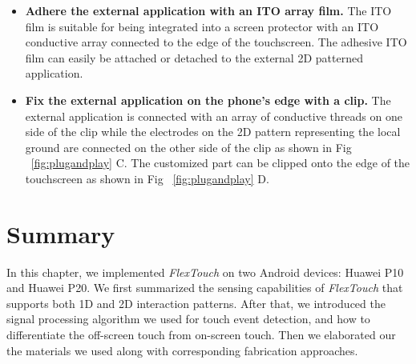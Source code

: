 \begin{itemize}
    \item \textbf{Adhere the external application with an ITO array film.} The ITO film is suitable for being integrated into a screen protector with an ITO conductive array connected to the edge of the touchscreen. The adhesive ITO film can easily be attached or detached to the external 2D patterned application. 
    \item \textbf{Fix the external application on the phone's edge with a clip.} The external application is connected with an array of conductive threads on one side of the clip while the electrodes on the 2D pattern representing the local ground are connected on the other side of the clip as shown in Fig ~\ref{fig:plugandplay} C. The customized part can be clipped onto the edge of the touchscreen as shown in Fig ~\ref{fig:plugandplay} D. 
\end{itemize}

\section{Summary}
In this chapter, we implemented \textit{FlexTouch} on two Android devices: Huawei P10 and Huawei P20. We first summarized the sensing capabilities of \textit{FlexTouch} that supports both 1D and 2D interaction patterns. After that, we introduced the signal processing algorithm we used for touch event detection, and how to differentiate the off-screen touch from on-screen touch. Then we elaborated our the materials we used along with corresponding fabrication approaches. 


